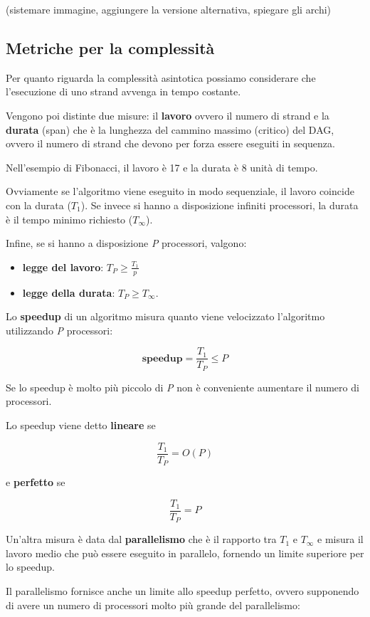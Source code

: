 (sistemare immagine, aggiungere la versione alternativa, spiegare gli
archi)

\subsection{Metriche per la complessità}\label{metriche-per-la-complessituxe0}

Per quanto riguarda la complessità asintotica possiamo considerare che l'esecuzione di uno strand avvenga in tempo costante.

Vengono poi distinte due misure: il \textbf{lavoro} ovvero il numero di strand e la \textbf{durata} (span) che è la lunghezza del cammino massimo (critico) del DAG, ovvero il numero di strand che devono per forza essere eseguiti in sequenza.

Nell'esempio di Fibonacci, il lavoro è 17 e la durata è 8 unità di tempo.

Ovviamente se l'algoritmo viene eseguito in modo sequenziale, il lavoro coincide con la durata ($T_1$). 
Se invece si hanno a disposizione infiniti processori, la durata è il tempo minimo richiesto ($T_\infty$). 

Infine, se si hanno a disposizione \emph{P} processori, valgono:

\begin{itemize}
	\item \textbf{legge del lavoro}: $T_P \geq \frac{T_1}{p}$
	\item \textbf{legge della durata}: $T_P \geq T_\infty$.
\end{itemize}

Lo \textbf{speedup} di un algoritmo misura quanto viene velocizzato l'algoritmo utilizzando \emph{P} processori:

$$\textbf{speedup} = \frac{T_1}{T_P} \leq P$$

Se lo speedup è molto più piccolo di \emph{P} non è conveniente aumentare il numero di processori.

Lo speedup viene detto \textbf{lineare} se

$$\frac{T_1}{T_P} = O(P)$$

e \textbf{perfetto} se

$$\frac{T_1}{T_P}  = P$$

Un'altra misura è data dal \textbf{parallelismo} che è il rapporto tra $T_1$ e $T_\infty$ e misura il lavoro medio che può essere eseguito in parallelo, fornendo un limite superiore per lo speedup.

Il parallelismo fornisce anche un limite allo speedup perfetto, ovvero supponendo di avere un numero di processori molto più grande del parallelismo:

